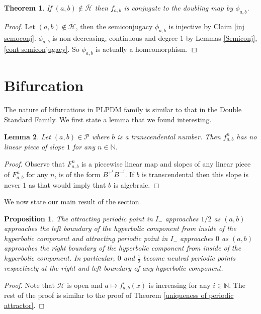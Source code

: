 \documentclass[12pt]{amsart}
\numberwithin{equation}{section}
\newtheorem{theorem}{Theorem}[section]
\newtheorem{proposition}{Proposition}[section]
\newtheorem{lemma}[theorem]{Lemma}
\theoremstyle{remark}
\begin{document}
{\begin{theorem}\label{conjugate doubling}
    If $(a,b) \notin \overline{\mathcal{H}}$ then $f_{a,b}$ is conjugate to the doubling map by $\phi_{a,b}$.
    
\end{theorem}
\begin{proof}
    Let $(a,b) \notin \overline{\mathcal{H}}$,  then the semiconjugacy $\phi_{a,b}$ is injective by Claim \ref{inj semoconj}. $\phi_{a,b}$ is non decreasing, continuous and degree 1 by Lemmas \ref{Semiconj},\ref{cont semiconjugacy}. So $\phi_{a,b}$ is actually a homeomorphism. 
\end{proof}












\section{Bifurcation}
The nature of bifurcations in PLPDM family is similar to that in the  Double Standard Family. We first state a lemma that we found interesting. 



\begin{lemma}
Let $(a,b) \in \mathcal{P}$ where $b$ is a transcendental number. Then $f_{a,b}^n$ has no linear piece of slope $1$ for any $n \in \mathbb{N}$.
    
\end{lemma}
\begin{proof}
Observe that  $F_{a,b}^n$ is a piecewise linear map and slopes of any linear piece of $F^n_{a,b}$ for any $n$, is of the form $B^{+^{i}}B^{-^{j}}$. If $b$ is transcendental then this slope is never 1 as that would imply that $b$ is algebraic.
\end{proof}

We now state our main result of the section.
\begin{proposition}\label{break bif}
    The attracting periodic point in $I_-$ approaches $1/2$ as $(a,b)$ approaches the left boundary of the hyperbolic component from inside of the hyperbolic component and attracting periodic point in $I_-$ approaches $0$ as $(a,b)$ approaches the right boundary of the hyperbolic component from inside of the hyperbolic component. In particular, $0$ and $\frac{1}{2}$ become  neutral periodic points respectively at the right and  left boundary of any hyperbolic component. 
\end{proposition}
\begin{proof}
    Note that $\mathcal{H}$ is open and $a \mapsto f^i_{a,b}(x)$ is increasing for any $i \in \mathbb{N}$. The rest of the proof is similar to the proof of  Theorem \ref{uniqueness of periodic attractor}.
\end{proof}


}
\end{document}
